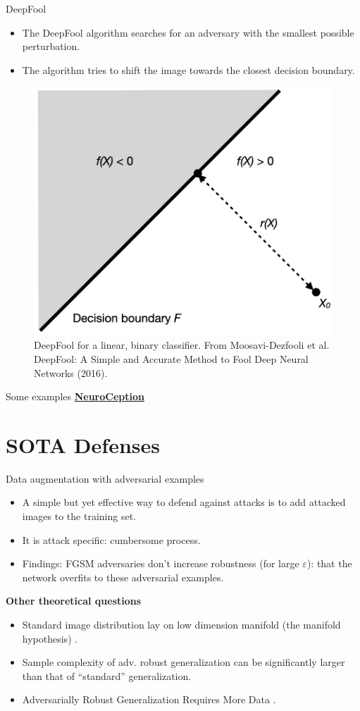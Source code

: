 \documentclass{beamer}
\begin{document}
\begin{frame}{DeepFool}
    \begin{itemize}
        \item The DeepFool algorithm searches for an adversary with the smallest possible perturbation. 
        \item The algorithm tries to shift the image towards the closest decision boundary. 
    \end{itemize}
    \begin{figure}[H]
        \centering
        \includegraphics[width=0.5\linewidth]{images/DeepFool.png}
        \caption{DeepFool for a linear, binary classifier. From Moosavi-Dezfooli et al. DeepFool: A Simple and Accurate Method to Fool Deep Neural Networks (2016).}
    \end{figure}
\end{frame}

\begin{frame}{Some examples}
    \href{https://www.neuralception.com/adversarialexamples-attacks}{\textbf{NeuroCeption}}
\end{frame}

\section{SOTA Defenses}

\begin{frame}{Data augmentation with adversarial examples}
    \begin{itemize}
        \item A simple but yet effective way to defend against attacks is to add attacked images to the training set.
        \item It is attack specific: cumbersome process.
        \item Findings: FGSM adversaries don’t increase robustness (for large $\varepsilon$): that the network overfits to these adversarial examples. 
    \end{itemize}
    
    \textbf{Other theoretical questions}
    \begin{itemize}
    \item Standard image distribution lay on low dimension manifold (the manifold hypothesis) \cite{fefferman2016testing}.
        \item Sample complexity of adv. robust generalization can be significantly larger than that of “standard” generalization.
        \item Adversarially Robust Generalization Requires More Data \cite{schmidt2018adversarially}.
    \end{itemize}
\end{frame}
\end{document}

